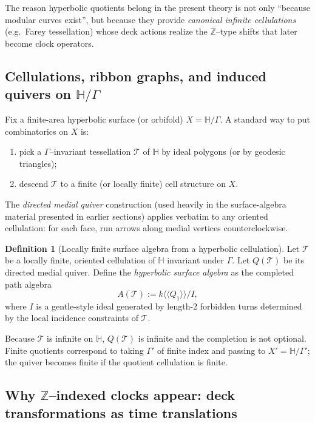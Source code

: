 \documentclass[11pt,oneside]{amsbook}
\numberwithin{equation}{section}
\theoremstyle{plain}
\theoremstyle{definition}
\newtheorem{definition}[theorem]{Definition}
\theoremstyle{remark}
\newcommand{\HH}{\mathbb{H}}
\newcommand{\Z}{\mathbb{Z}}
\begin{document}
The reason hyperbolic quotients belong in the present theory is not only ``because modular curves exist'', but because they provide \emph{canonical infinite cellulations} (e.g.\ Farey tessellation) whose deck actions realize the $\Z$--type shifts that later become clock operators.

\subsection{Cellulations, ribbon graphs, and induced quivers on $\HH/\Gamma$}
\label{sec:cellulations}

Fix a finite-area hyperbolic surface (or orbifold) $X=\HH/\Gamma$.
A standard way to put combinatorics on $X$ is:

\begin{enumerate}
\item pick a $\Gamma$--invariant tessellation $\mathcal{T}$ of $\HH$ by ideal polygons (or by geodesic triangles);
\item descend $\mathcal{T}$ to a finite (or locally finite) cell structure on $X$.
\end{enumerate}

The \emph{directed medial quiver} construction (used heavily in the surface-algebra material presented in earlier sections) applies verbatim to any oriented cellulation: for each face, run arrows along medial vertices counterclockwise.

\begin{definition}[Locally finite surface algebra from a hyperbolic cellulation]
Let $\mathcal{T}$ be a locally finite, oriented cellulation of $\HH$ invariant under $\Gamma$.
Let $Q(\mathcal{T})$ be its directed medial quiver.
Define the \emph{hyperbolic surface algebra} as the completed path algebra
\[
A(\mathcal{T}) := k\langle\!\langle Q_1\rangle\!\rangle / I,
\]
where $I$ is a gentle-style ideal generated by length-$2$ forbidden turns determined by the local incidence constraints of $\mathcal{T}$.
\end{definition}

Because $\mathcal{T}$ is infinite on $\HH$, $Q(\mathcal{T})$ is infinite and the completion is not optional.
Finite quotients correspond to taking $\Gamma'$ of finite index and passing to $X'=\HH/\Gamma'$; the quiver becomes finite if the quotient cellulation is finite.

\subsection{Why $\Z$--indexed clocks appear: deck transformations as time translations}
\label{sec:deck_time}
\end{document}

